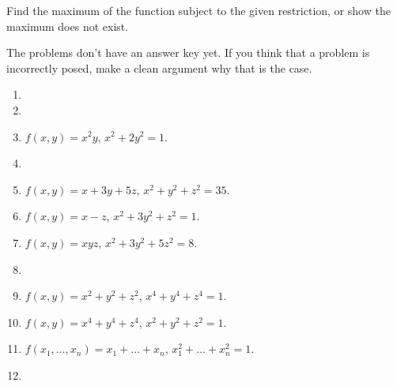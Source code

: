 Find the maximum of the function subject to the given restriction, or show the maximum does not exist. 

The problems don't have an answer key yet. If you think that a problem is incorrectly posed, make a clean argument why that is the case. 
\begin{enumerate}[ref={\fcProblemRef}]
\item 
\item 

\item $f(x,y)=x^2y$, $x^2+2y^2 =1$.
\item 

\item $f(x,y)=x+3y+5z$, $x^2+y^2+z^2 =35$.
\item $f(x,y)=x-z$, $x^2+3y^2+z^2 =1$.
\item $f(x,y)=xyz$, $x^2+3y^2+5z^2 =8$.
\item  
\item $f(x,y)=x^2+y^2+z^2 $, $x^4+y^4+z^4 =1$.
\item $f(x,y)=x^4+y^4+z^4$, $x^2+y^2+z^2 =1$.
\item $f(x_1,\dots, x_n) = x_1+\dots +x_n$, $x_1^2+\dots +x_n^2 =1$.

\item 
\end{enumerate}